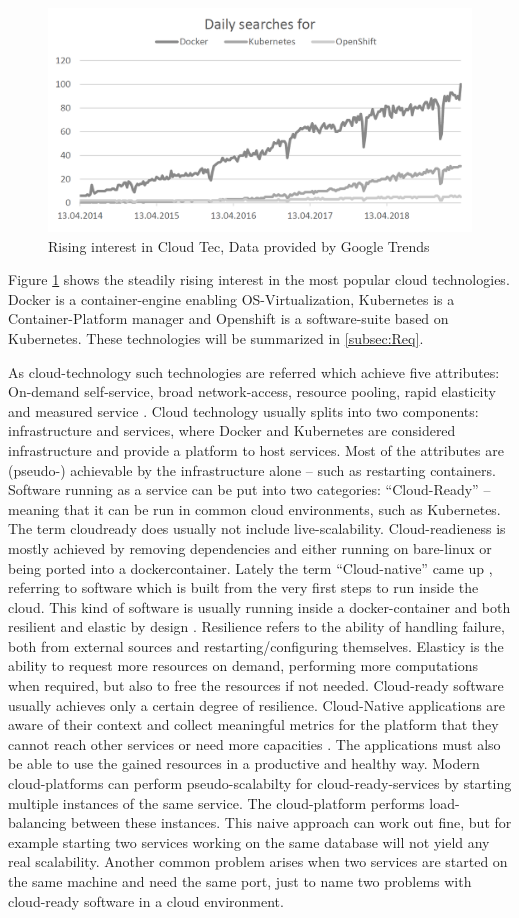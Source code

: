 \documentclass[utf8]{lni}
\begin{document}
\begin{figure}[h]
	\centering
	\includegraphics[width=0.5\linewidth]{imgs/DigDocker}
	\caption{Rising interest in Cloud Tec, Data provided by Google Trends}
	\label{fig:digdocker}	
\end{figure}

Figure \ref{fig:digdocker} shows the steadily rising interest in the most popular cloud technologies. 
Docker is a container-engine enabling OS-Virtualization, Kubernetes is a Container-Platform manager and Openshift is a software-suite based on Kubernetes. 
These technologies will be summarized in \ref{subsec:Req}.  

As cloud-technology such technologies are referred which achieve five attributes: 
On-demand self-service, broad network-access, resource pooling, rapid elasticity and measured service \cite{ME11}. 
Cloud technology usually splits into two components:  infrastructure  and  services,  where  Docker and Kubernetes are considered infrastructure and provide a  platform  to  host  services.  
Most  of  the  attributes  are (pseudo-) achievable by the infrastructure alone – such as restarting containers. 
Software running as a service can be put into two categories: 
“Cloud-Ready” – meaning that it can be run in common cloud environments, such as Kubernetes. 
The term cloudready  does  usually  not  include  live-scalability. Cloud-readieness is mostly achieved by removing dependencies and either running on bare-linux or being ported into a dockercontainer. 
Lately the term “Cloud-native” came up \cite{BI17}, referring to software which is built from the very first steps to run inside the cloud. This kind of software is usually running inside a docker-container and both resilient and elastic by design \cite{TO17}.  
Resilience refers to the ability of handling failure, both from external sources and restarting/configuring themselves.  
Elasticy is the ability to request more resources on demand, performing more computations when required, but also to free the resources if not needed. 
Cloud-ready software usually achieves only a certain degree of resilience.   
Cloud-Native applications are aware of their context and collect meaningful metrics for the platform that they cannot reach other services or need more capacities \cite{MIN18}. 
The applications must also be able to use the gained resources in a productive and healthy way.  
Modern  cloud-platforms  can  perform  pseudo-scalabilty for cloud-ready-services by starting multiple instances of the same service. 
The cloud-platform performs load-balancing between these instances. 
This naive approach can work out fine, but for example starting two services working on the same database will not yield any real scalability. 
Another common problem arises when two services are started on the same machine and need the same port, just to name two problems with cloud-ready  software in a cloud environment. 
\end{document}
